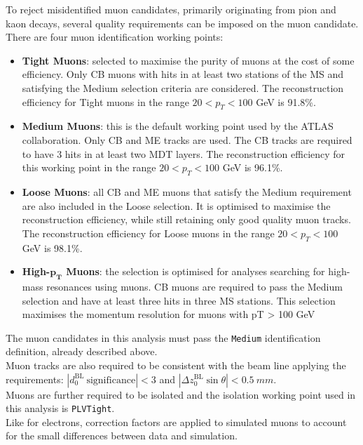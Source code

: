 To reject misidentified muon candidates, primarily originating from pion and kaon decays, several 
quality requirements can be imposed on the muon candidate.\\
There are four muon identification working points:
\begin{itemize}
	\item \textbf{Tight Muons}: selected to maximise the purity of muons
at the cost of some efficiency. Only CB muons with hits in at least two stations
of the MS and satisfying the Medium selection criteria are considered.
The reconstruction efficiency for Tight muons in the range $20 < p_T < 100$ GeV is 91.8\%.
	\item \textbf{Medium Muons}: this is the default working point used by the ATLAS collaboration.
Only CB and ME tracks are used. The CB tracks are required to have 3 hits in at
least two MDT layers. The reconstruction efficiency for this working point in
the range $20 < p_T < 100$ GeV is 96.1\%.
	\item \textbf{Loose Muons}: all CB and ME muons that satisfy the Medium requirement are also
included in the Loose selection. It is optimised to maximise the reconstruction efficiency, while 
still retaining only good quality muon tracks. The reconstruction efficiency for
Loose muons in the range $20 < p_T < 100$ GeV is 98.1\%.
	\item \textbf{High-$\bm{p_T}$ Muons}: the selection is optimised for analyses searching for
high-mass resonances using muons. CB muons are required to pass the Medium selection
and have at least three hits in three MS stations. This selection maximises the momentum
resolution for muons with pT > 100 GeV
\end{itemize}
The muon candidates in this analysis must pass the \texttt{Medium}
identification definition, already described above.\\
Muon tracks are also required to be consistent with the beam line
applying the requirements: 
$|d_0^\mathrm{BL}~\mathrm{significance} | < 3$ and 
$|\Delta z_0^\mathrm{BL} \sin\theta| < \SI{0.5}{mm}$. \\
Muons are further required to be isolated and the isolation working point used in this analysis is \texttt{PLVTight}.\\
Like for electrons, correction factors are applied to simulated muons
to account for the small differences between data and simulation. 

